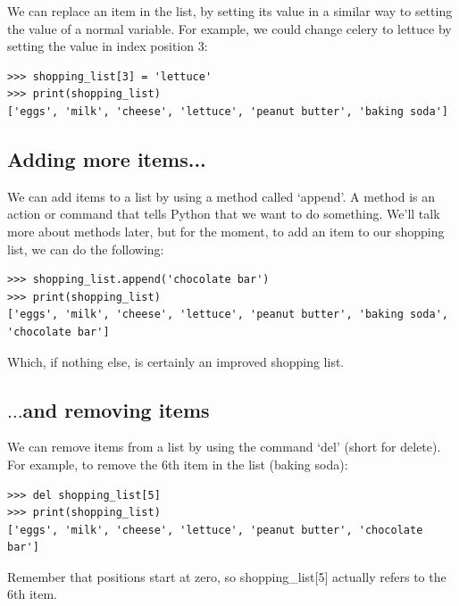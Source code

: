 We can replace an item in the list, by setting its value in a similar way to setting the value of a normal variable. For example, we could change celery to lettuce by setting the value in index position 3:

\begin{listing}
\begin{verbatim}
>>> shopping_list[3] = 'lettuce'
>>> print(shopping_list)
['eggs', 'milk', 'cheese', 'lettuce', 'peanut butter', 'baking soda']
\end{verbatim}
\end{listing}

\subsection*{\color{BrickRed}Adding more items...}

We can add items to a list by using a method called `append'.  A method is an action or command that tells Python that we want to do something.  We'll talk more about methods later, but for the moment, to add an item to our shopping list, we can do the following:

\begin{listing}
\begin{verbatim}
>>> shopping_list.append('chocolate bar')
>>> print(shopping_list)
['eggs', 'milk', 'cheese', 'lettuce', 'peanut butter', 'baking soda', 
'chocolate bar']
\end{verbatim}
\end{listing}

Which, if nothing else, is certainly an improved shopping list.

\subsection*{\color{BrickRed}$\ldots$and removing items}

We can remove items from a list by using the command `del' (short for delete).  For example, to remove the 6th item in the list (baking soda):

\begin{listing}
\begin{verbatim}
>>> del shopping_list[5]
>>> print(shopping_list)
['eggs', 'milk', 'cheese', 'lettuce', 'peanut butter', 'chocolate bar']
\end{verbatim}
\end{listing}

Remember that positions start at zero, so shopping\_list[5] actually refers to the 6th item.

